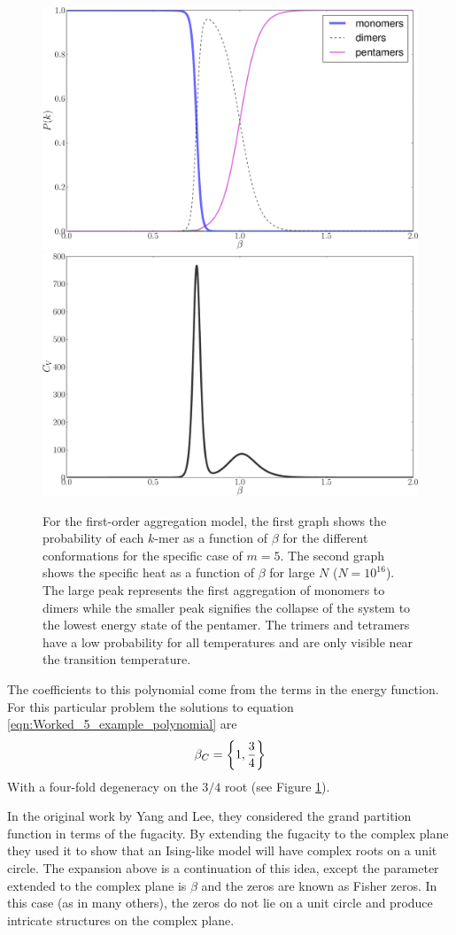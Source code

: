 \begin{figure}[ht]
\includegraphics[width=.47 \textwidth]{pictures/aggregation_model/pictures/N=5_PZ.pdf}
\includegraphics[width=.47 \textwidth]{pictures/aggregation_model/pictures/N=5_CV.pdf}
\caption{For the first-order aggregation model, the first graph shows the probability of each $k$-mer as a function of $\beta$ for the different conformations for the specific case of $m=5$. The second graph shows the specific heat as a function of $\beta$ for large $N$ ($N=10^{16}$). The large peak represents the first aggregation of monomers to dimers while the smaller peak signifies the collapse of the system to the lowest energy state of the pentamer. The trimers and tetramers have a low probability for all temperatures and are only visible near the transition temperature.}
\label{fig:Worked_5_example_picture}
\end{figure}
%
The coefficients to this polynomial come from the terms in the energy function. For this particular problem the solutions to equation \ref{eqn:Worked_5_example_polynomial} are
\begin{equation}
\beta_C = \left \{  1, \frac{3}{4}  \right \}
\end{equation}
With a four-fold degeneracy on the $3/4$ root (see Figure \ref{fig:Worked_5_example_picture}). 

In the original work by Yang and Lee,\cite{lee_statistical_1952} they considered the grand partition function in terms of the fugacity. By extending the fugacity to the complex plane they used it to show that an Ising-like model will have complex roots on a unit circle. The expansion above is a continuation of this idea, except the parameter extended to the complex plane is $\beta$ and the zeros are known as Fisher zeros.\cite{fisher_1965_nature} In this case (as in many others), the zeros do not lie on a unit circle and produce intricate structures on the complex plane.

